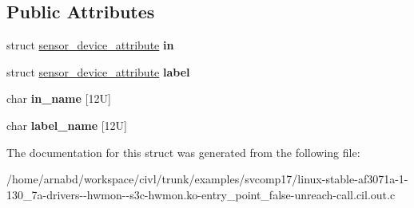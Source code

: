 \subsection*{Public Attributes}
\begin{DoxyCompactItemize}
\item 
\hypertarget{structs3c__hwmon__attr_abe73f3ae659b012be281a414133e4d0b}{}struct \hyperlink{structsensor__device__attribute}{sensor\+\_\+device\+\_\+attribute} {\bfseries in}\label{structs3c__hwmon__attr_abe73f3ae659b012be281a414133e4d0b}

\item 
\hypertarget{structs3c__hwmon__attr_a8acf2687a2e4f66aba145f5ec78efd8f}{}struct \hyperlink{structsensor__device__attribute}{sensor\+\_\+device\+\_\+attribute} {\bfseries label}\label{structs3c__hwmon__attr_a8acf2687a2e4f66aba145f5ec78efd8f}

\item 
\hypertarget{structs3c__hwmon__attr_a133050a1020375c23032bca630d84cc6}{}char {\bfseries in\+\_\+name} \mbox{[}12\+U\mbox{]}\label{structs3c__hwmon__attr_a133050a1020375c23032bca630d84cc6}

\item 
\hypertarget{structs3c__hwmon__attr_a1c5ba8cbbb6d1a1d6e3afbefcaddf2b0}{}char {\bfseries label\+\_\+name} \mbox{[}12\+U\mbox{]}\label{structs3c__hwmon__attr_a1c5ba8cbbb6d1a1d6e3afbefcaddf2b0}

\end{DoxyCompactItemize}


The documentation for this struct was generated from the following file\+:\begin{DoxyCompactItemize}
\item 
/home/arnabd/workspace/civl/trunk/examples/svcomp17/linux-\/stable-\/af3071a-\/1-\/130\+\_\+7a-\/drivers-\/-\/hwmon-\/-\/s3c-\/hwmon.\+ko-\/entry\+\_\+point\+\_\+false-\/unreach-\/call.\+cil.\+out.\+c\end{DoxyCompactItemize}
